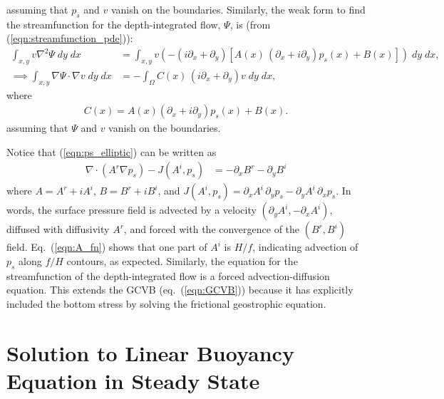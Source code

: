 \documentclass[10pt]{amsart}
\begin{document}
assuming that $p_s$ and $v$ vanish on the boundaries.
Similarly, the weak form to find the streamfunction for the depth-integrated flow, $\Psi$, is (from (\ref{eqn:streamfunction_pde})):
 \begin{align}
 \int_{x,y} v
\nabla^2 \Psi \; dy\; dx 
 & = \int_{x,y} v \left(
- \left( i \partial_x + \partial_y \right) \left[ A(x)\,\left( \partial_x + i \partial_y \right) p_s(x)  + B(x) \right] 
\right) \; dy\; dx , \nonumber \\
 \implies 
 \int_{x,y} \nabla \Psi \cdot \nabla v \; dy \; dx
 & = - \int_\Omega C(x) \, (i\partial_x + \partial_y)v \; d y \; dx , \nonumber
\end{align}
where
\begin{align}
C(x) = A(x) (\partial_x + i\partial_y)p_s(x) + B(x) . \nonumber
\end{align}
assuming that $\Psi$ and $v$ vanish on the boundaries.

Notice that (\ref{eqn:ps_elliptic}) can be written as
\begin{align}
\nabla \cdot \left( A^r \nabla p_s \right) - J \left( A^i , p_s \right) & = -  \partial_x B^r  -  \partial_y B^i 
\label{eqn:p_s_advection_diffusion}
\end{align}
where $A = A^r + i A^i$, $B = B^r + i B^i$, and $J(A^i, p_s) = \partial_x A^i \, \partial_y p_s - \partial_y A^i \, \partial_x p_s$.
In words, the surface pressure field is advected by a velocity $(\partial_y A^i, -\partial_x A^i)$, diffused with diffusivity $A^r$, and forced with the convergence of the $(B^r, B^i)$ field.
Eq.~(\ref{eqn:A_fn}) shows that one part of $A^i$ is $H/f$, indicating advection of $p_s$ along $f/H$ contours, as expected.
Similarly, the equation for the streamfunction of the depth-integrated flow is a forced advection-diffusion equation.
This extends the GCVB (eq.~(\ref{eqn:GCVB})) because it has explicitly included the bottom stress by solving the frictional geostrophic equation.


\section{Solution to Linear Buoyancy Equation in Steady State}
\label{sec:b_solution}
\end{document}
